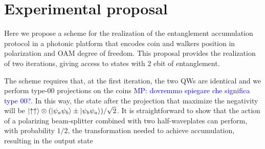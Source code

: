 \documentclass[
	aps, pra,
	superscriptaddress, twocolumn,
	floatfix,
	10pt
]{revtex4-1}
\begin{document}



\section{Experimental proposal}
\label{sec:experimental_proposal}
Here we propose a scheme for the realization of the entanglement accumulation protocol in a photonic platform that encodes coin and walkers position in polarization and OAM degree of freedom. This proposal provides the realization of two iterations, giving access to states with 2 ebit of entanglement. 

The scheme requires that, at the first iteration, the two QWs are identical and we perform type-00 projections on the coins \textcolor{blue}{MP: dovremmo spiegare che significa type 00?}. In this way, the state after the projection that maximize the negativity will be $\ket{\uparrow \uparrow}\otimes(\ket{\psi_a\psi_b}\pm\ket{\psi_b\psi_a})/\sqrt2$. 
It is straightforward to show that the action of a polarizing beam-splitter combined with two half-waveplates can perform, with probability $1/2$, the transformation needed to achieve accumulation, resulting in the output state
\end{document}
